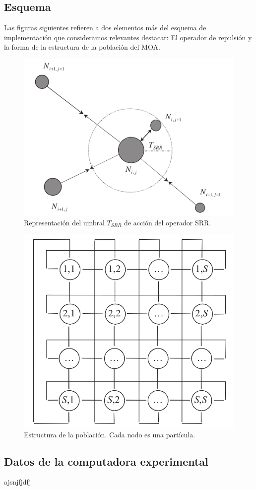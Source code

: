 \documentclass[12pt]{article}
\begin{document}
\subsection*{Esquema}
Las figuras siguientes refieren a dos elementos más del esquema de
implementación que consideramos relevantes destacar: El operador de repulsión y la forma de la estructura de la población del MOA.
\begin{multicols}{2}
\begin{figure}[H]
  \centering
  \includegraphics[width=.5\textwidth]{SRR}
  \caption{Representación del umbral $T_{SRR}$ de acción del operador SRR.}
\end{figure}
\begin{figure}[H]
  \centering
  \includegraphics[width=.437\textwidth]{cell}
  \caption{Estructura de la población. Cada nodo es una partícula.}
\end{figure}
\end{multicols}

\subsection*{Datos de la computadora experimental}
ajsnjfjdfj
\end{document}
